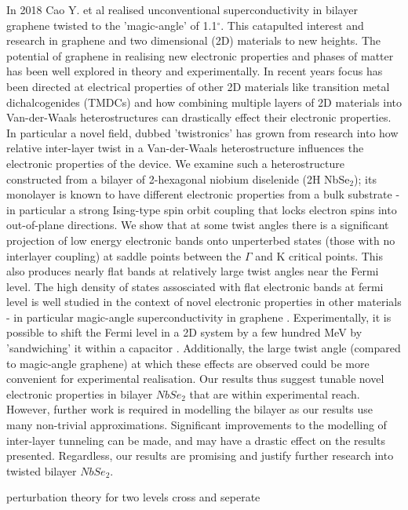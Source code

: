 \documentclass[12pt]{report} %
\begin{document}
  In 2018 Cao Y. et al\cite{Cao2018} realised unconventional superconductivity in bilayer graphene twisted to the 'magic-angle' of 1.1$^\circ$. This catapulted interest and research in graphene and two dimensional (2D) materials to new heights. The potential of graphene in realising new electronic properties and phases of matter has been well explored in theory and experimentally. In recent years focus has been directed at electrical properties of other 2D materials like transition metal dichalcogenides (TMDCs) and how combining multiple layers  of 2D materials into Van-der-Waals heterostructures can drastically effect their electronic properties. In particular a novel field, dubbed 'twistronics' has grown from research into how relative inter-layer twist in a Van-der-Waals heterostructure influences the electronic properties of the device. We examine such a heterostructure constructed from a bilayer of 2-hexagonal niobium diselenide (2H NbSe$_2$); its monolayer is known to have different electronic properties from a bulk substrate - in particular a strong Ising-type spin orbit coupling that locks electron spins into out-of-plane directions. We show that at some twist angles there is a significant projection of low energy electronic bands onto unperterbed states (those with no interlayer coupling) at saddle points between the $\Gamma$ and K critical points. This also produces nearly flat bands at relatively large twist angles near the Fermi level. The high density of states assosciated with flat electronic bands at fermi level is well studied in the context of novel electronic properties in other materials \cite{} - in particular magic-angle superconductivity in graphene \cite{}. Experimentally, it is possible to shift the Fermi level in a 2D system by a few hundred MeV by 'sandwiching' it within a capacitor \cite{}. Additionally, the large twist angle (compared to magic-angle graphene) at which these effects are observed could be more convenient for experimental realisation. Our results thus suggest tunable novel electronic properties in bilayer $NbSe_2$ that are within experimental reach. However, further work is required in modelling the bilayer as our results use many non-trivial approximations. Significant improvements to the modelling of inter-layer tunneling can be made, and may have a drastic effect on the results presented. Regardless, our results are promising and justify further research into twisted bilayer $NbSe_2$.

  perturbation theory for two levels cross and seperate
\end{document}

